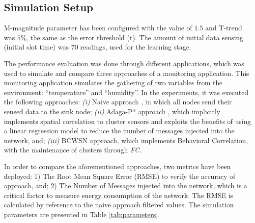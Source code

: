 \documentclass{acm_proc_article-sp}
\begin{document}
\subsection{Simulation Setup}
\label{data-and-experiments}

M-magnitude parameter has been configured with the value of $1.5$ and T-trend
was $5\%$, the same as the error threshold (t). The amount of initial data sensing
(initial slot time) was 70 readings, used for the learning stage.
\vspace*{-.3cm}

The performance evaluation was done through different applications, which was used
to simulate and compare three approaches of a monitoring application. 
This monitoring application simulates the gathering of two variables from the
environment: ``temperature'' and ``humidity''.
In the experiments, it was executed the following approaches: {\it
  (i)} Naive approach \cite{Madden2005}, in which all nodes send their sensed
data to the sink node;  {\it
  (ii)} Adaga-P* approach \cite{MaiaACR2013}, which
implicitly implements spatial correlation to cluster sensors and exploits the
benefits of using a linear regression model to reduce the number of messages
injected into the network, and;  {\it 
  (iii)} BCWSN approach, which implements Behavioral Correlation, with the
  maintenance of clusters through \textit{FC}.
\vspace*{-.3cm}

In order to compare the aforementioned approaches, two metrics have been
deployed: 1) The Root Mean Square Error (RMSE) to verify the accuracy of
approach, and; 2) The Number of Messages injected into the network, which is a
critical factor to measure energy consumption of the network. The RMSE is
calculated by reference to the naive approach filtered values.
The simulation parameters are presented in Table \ref{tab:parameters}.
\end{document}
